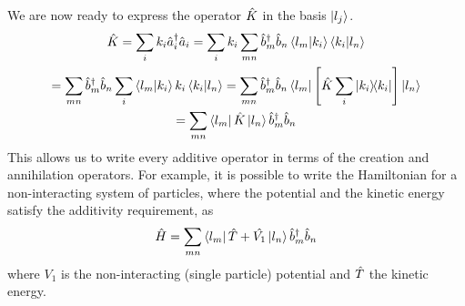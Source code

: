 We are now ready to express the operator $\hat{K}$ in the basis $\ket{l_j}$.
\begin{multline}
    \hat{K} =  \sum_i k_i  \hat{a}^\dagger_i\hat{a}_i
    = \sum_i k_i \sum_{mn} \hat{b}^\dagger_m\hat{b}_n \braket{l_m}{k_i}\braket{k_i}{l_n}
    \\ = \sum_{mn} \hat{b}^\dagger_m\hat{b}_n \sum_i \braket{l_m}{k_i} k_i \braket{k_i}{l_n}
    = \sum_{mn} \hat{b}^\dagger_m\hat{b}_n \bra{l_m} \left[ \hat{K} \sum_i \op{k_i} \right] \ket{l_n}
    \\= \sum_{mn}  \bra{l_m}\hat{K}\ket{l_n} \hat{b}^\dagger_m\hat{b}_n
\end{multline}
This allows us to write every additive operator in terms of the creation and annihilation operators. For example, it is possible to write the Hamiltonian for a non-interacting system of particles, where the potential and the kinetic energy satisfy the additivity requirement, as
\begin{equation} \label{eq:second_quantization}
    \hat{H} = \sum_{mn} \bra{l_m}\hat{T}+\hat{V_1}\ket{l_n} \hat{b}^\dagger_m\hat{b}_n
\end{equation}
where $V_1$ is the non-interacting (single particle) potential and $\hat{T}$ the kinetic energy.